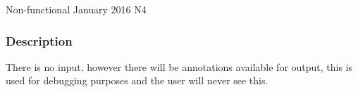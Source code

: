 \documentclass[12pt]{report}
\begin{document}
{Non-functional}
{January 2016}
{N4}
\vspace{-12pt}\subsubsection*{Description}
There is no input, however there will be annotations available for output, this 
is used for debugging purposes and the user will never see this.
		
		

\end{document}
